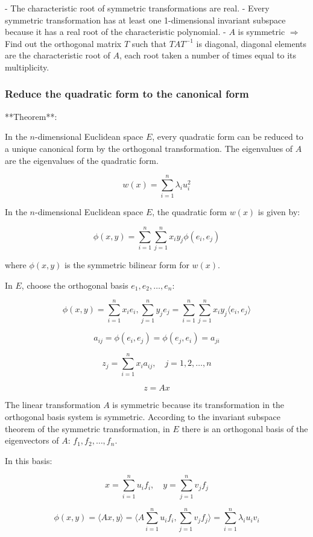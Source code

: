 - The characteristic root of symmetric transformations are real.
- Every symmetric transformation has at least one 1-dimensional invariant subspace because it has a real root of the characteristic polynomial.
- $A$ is symmetric $\Rightarrow$ Find out the orthogonal matrix $T$ such that $TAT^{-1}$ is diagonal, diagonal elements are the characteristic root of $A$, each root taken a number of times equal to its multiplicity.

\subsubsection{Reduce the quadratic form to the canonical form}

**Theorem**:

In the $n$-dimensional Euclidean space $E$, every quadratic form can be reduced to a unique canonical form by the orthogonal transformation. The eigenvalues of $A$ are the eigenvalues of the quadratic form.

\[
w(x) = \sum_{i=1}^n \lambda_i u_i^2
\]

In the $n$-dimensional Euclidean space $E$, the quadratic form $w(x)$ is given by:

\[
\phi(x, y) = \sum_{i=1}^n \sum_{j=1}^n x_i y_j \phi(e_i, e_j)
\]

where $\phi(x, y)$ is the symmetric bilinear form for $w(x)$.

In $E$, choose the orthogonal basis $e_1, e_2, \ldots, e_n$:

\[
\phi(x, y) = \sum_{i=1}^n x_i e_i, \sum_{j=1}^n y_j e_j = \sum_{i=1}^n \sum_{j=1}^n x_i y_j \langle e_i, e_j \rangle
\]

\[
a_{ij} = \phi(e_i, e_j) = \phi(e_j, e_i) = a_{ji}
\]

\[
z_j = \sum_{i=1}^n x_i a_{ij}, \quad j = 1, 2, \ldots, n
\]

\[
z = Ax
\]

The linear transformation $A$ is symmetric because its transformation in the orthogonal basis system is symmetric. According to the invariant subspace theorem of the symmetric transformation, in $E$ there is an orthogonal basis of the eigenvectors of $A$: $f_1, f_2, \ldots, f_n$.

In this basis:

\[
x = \sum_{i=1}^n u_i f_i, \quad y = \sum_{j=1}^n v_j f_j
\]

\[
\phi(x, y) = \langle Ax, y \rangle = \langle A \sum_{i=1}^n u_i f_i, \sum_{j=1}^n v_j f_j \rangle = \sum_{i=1}^n \lambda_i u_i v_i
\]

